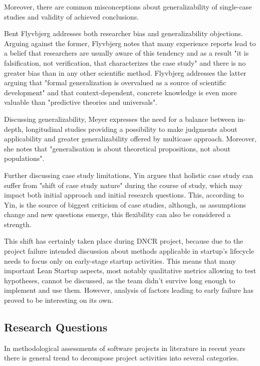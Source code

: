 \documentclass{article}
\begin{document}
Moreover, there are common misconceptions about generalizability of single-case studies and validity of achieved conclusions.

Bent Flyvbjerg \cite{flyvbjerg2006five} addresses both researcher bias and generalizability objections. Arguing against the former, Flyvbjerg notes that many experience reports lead to a belief that researchers are usually aware of this tendency and as a result "it is falsification, not verification, that characterizes the case study" and there is no greater bias than in any other scientific method. Flyvbjerg addresses the latter arguing that "formal generalization is overvalued as a source of scientific development" and that context-dependent, concrete knowledge is even more valuable than "predictive theories and universals".

Discussing generalizability, Meyer \cite{meyer2001case} expresses the need for a balance between in-depth, longitudinal studies providing a possibility to make judgments about applicability and greater generalizability offered by multicase approach. Moreover, she notes that "generalisation is about theoretical propositions, not about populations".

Further discussing case study limitations, Yin \cite{yin2013case} argues that holistic case study can suffer from "shift of case study nature" during the course of study, which may impact both initial approach and initial research questions. This, according to Yin, is the source of biggest criticism of case studies, although, as assumptions change and new questions emerge, this flexibility can also be considered a strength.

This shift has certainly taken place during DNCR project, because due to the project failure intended discussion about methods applicable in startup's lifecycle needs to focus only on early-stage startup activities. This means that many important Lean Startup aspects, most notably qualitative metrics allowing to test hypotheses, cannot be discussed, as the team didn't survive long enough to implement and use them. However, analysis of factors leading to early failure has proved to be interesting on its own.

\subsection{Research Questions}
In methodological assessments of software projects in literature in recent years there is general trend to decompose project activities into several categories.
\end{document}
